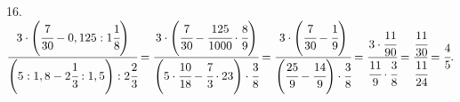 16. $\cfrac{3\cdot\left(\cfrac{7}{30}-0,125:1\cfrac{1}{8}\right)}{\left(5:1,8-2\cfrac{1}{3}:1,5\right):2\cfrac{2}{3}}=
\cfrac{3\cdot\left(\cfrac{7}{30}-\cfrac{125}{1000}\cdot\cfrac{8}{9}\right)}{\left(5\cdot\cfrac{10}{18}-\cfrac{7}{3}\cdot{2}{3}\right)\cdot\cfrac{3}{8}}=
\cfrac{3\cdot\left(\cfrac{7}{30}-\cfrac{1}{9}\right)}{\left(\cfrac{25}{9}-\cfrac{14}{9}\right)\cdot\cfrac{3}{8}}=
\cfrac{3\cdot\cfrac{11}{90}}{\cfrac{11}{9}\cdot\cfrac{3}{8}}=\cfrac{\cfrac{11}{30}}{\cfrac{11}{24}}=\cfrac{4}{5}.$\\
